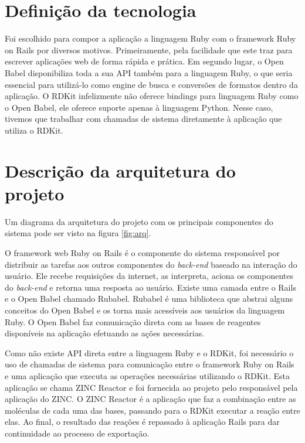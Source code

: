 \documentclass{abnt}
\begin{document}
\section{Definição da tecnologia}

Foi escolhido para compor a aplicação a linguagem Ruby\cite{ruby} com o framework Ruby on Rails\cite{rails}
por diversos motivos. Primeiramente, pela facilidade que este traz para escrever
aplicações web de forma rápida e prática. Em segundo lugar, o Open Babel disponibiliza
toda a sua API também para a linguagem Ruby, o que seria essencial para utilizá-lo
como engine de busca e conversões de formatos dentro da aplicação. O RDKit infelizmente
não oferece bindings para linguagem Ruby como o Open Babel, ele oferece suporte
apenas à linguagem Python\cite{python}. Nesse caso, tivemos que trabalhar com chamadas de sistema
diretamente à aplicação que utiliza o RDKit.

\section{Descrição da arquitetura do projeto}

Um diagrama da arquitetura do projeto com os principais componentes do sistema pode
ser visto na figura \ref{fig:arq}.

O framework web Ruby on Rails é o componente do sistema responsável por distribuir
as tarefas aos outros componentes do \textit{back-end} baseado na interação do usuário. Ele
recebe requisições da internet, as interpreta, aciona os componentes do \textit{back-end}
e retorna uma resposta ao usuário. Existe uma camada entre o Rails e o Open Babel
chamado Rubabel\cite{RUBABEL}. Rubabel é uma biblioteca que abstrai alguns conceitos do Open Babel
e os torna mais acessíveis aos usuários da linguagem Ruby. O Open Babel faz comunicação
direta com as bases de reagentes disponíveis na aplicação efetuando as ações necessárias.

Como não existe API direta entre a linguagem Ruby e o RDKit, foi necessário o uso
de chamadas de sistema para comunicação entre o framework Ruby on Rails e uma aplicação
que executa as operações necessárias utilizando o RDKit. Esta aplicação se chama
ZINC Reactor e foi fornecida ao projeto pelo responsável pela aplicação do ZINC.
O ZINC Reactor é a aplicação que faz a combinação entre as moléculas de cada uma
das bases, passando para o RDKit executar a reação entre elas. Ao final, o resultado
das reações é repassado à aplicação Rails para dar continuidade ao processo de exportação.
\end{document}
